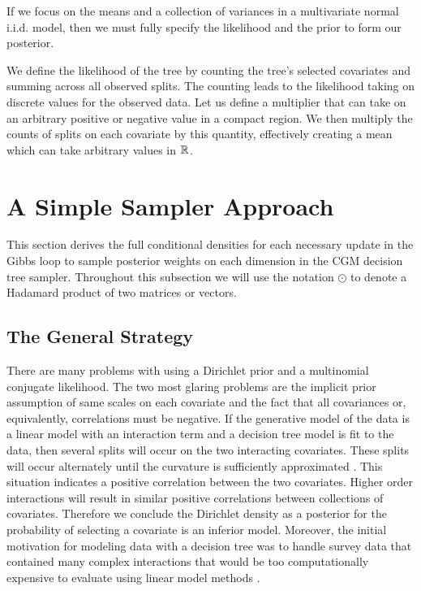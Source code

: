  If we focus on the means and a collection of variances in a multivariate normal i.i.d. model, then we must fully specify the likelihood and the prior to form our posterior. 
 
We define the likelihood of the tree by counting the tree's selected covariates and summing across all observed splits. The counting leads to the likelihood taking on discrete values for the observed data. Let us define a multiplier that can take on an arbitrary positive or negative value in a compact region. We then multiply the counts of splits on each covariate by this quantity, effectively creating a mean which can take arbitrary values in $\mathbb{R}^{}$. 

\section{A Simple Sampler Approach}\label{subsec:simple_sampler}

This section derives the full conditional densities for each necessary update in the Gibbs loop to sample posterior weights on each dimension in the CGM decision tree sampler. 
 Throughout this subsection we will use the notation $\odot$ to denote a Hadamard product of two matrices or vectors. 
 
 \subsection{The General Strategy}
 There are many problems with using a Dirichlet prior and a multinomial conjugate likelihood. The two most glaring problems are the implicit prior assumption of same scales on each covariate and the fact that all covariances or, equivalently, correlations must be negative. If the generative model of the data is a linear model with an interaction term and a decision tree model is fit to the data, then several splits will occur on the two interacting covariates. These splits will occur alternately until the curvature is sufficiently approximated \cite{ishwaran2010high}. This situation indicates a positive correlation between the two covariates. Higher order interactions will result in similar positive correlations between collections of covariates. Therefore we conclude the Dirichlet density as a posterior for the probability of selecting a covariate is an inferior model. Moreover, the initial motivation for modeling data with a decision tree was to handle survey data that contained many complex interactions that would be too computationally expensive to evaluate using linear model methods \cite{morgan1963problems}. 
 
